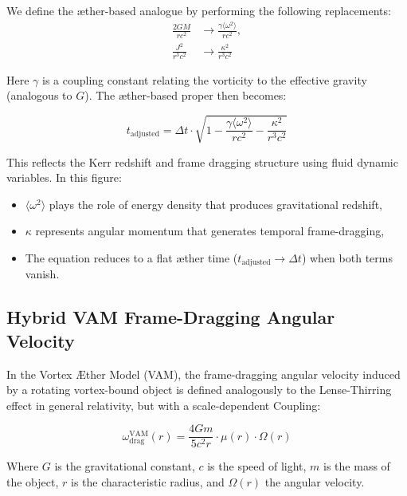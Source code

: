We define the æther-based analogue by performing the following replacements:
\begin{equation}
    \begin{aligned}
        \frac{2GM}{rc^2} &\rightarrow \frac{\gamma \langle \omega^2 \rangle}{rc^2}, \\
        \frac{J^2}{r^3c^2} &\rightarrow \frac{\kappa^2}{r^3c^2}
    \end{aligned}
    \label{eq:Kerr_replacements}
\end{equation}

Here $\gamma$ is a coupling constant relating the vorticity to the effective gravity (analogous to $G$). The æther-based proper then becomes:

\begin{equation}
    \boxed{t_\text{adjusted} = \Delta t \cdot \sqrt{1 - \frac{\gamma \langle \omega^2 \rangle}{rc^2} - \frac{\kappa^2}{r^3c^2}}}
    \label{eq:Kerr_time_dilation_ae}
\end{equation}

This reflects the Kerr redshift and frame dragging structure using fluid dynamic variables. In this figure:
\begin{itemize}
    \item $\langle \omega^2 \rangle$ plays the role of energy density that produces gravitational redshift,
    \item $\kappa$ represents angular momentum that generates temporal frame-dragging,
    \item The equation reduces to a flat æther time ($t_\text{adjusted} \to \Delta t$) when both terms vanish.

\end{itemize}

\subsection*{Hybrid VAM Frame-Dragging Angular Velocity}

In the Vortex Æther Model (VAM), the frame-dragging angular velocity induced by a rotating vortex-bound object is defined analogously to the Lense-Thirring effect in general relativity, but with a scale-dependent Coupling:

\begin{equation}
    \omega_\text{drag}^\text{VAM}(r) =
    \frac{4 G m}{5 c^2 r} \cdot \mu(r) \cdot \Omega(r)
\end{equation}

Where \( G \) is the gravitational constant, \( c \) is the speed of light, \( m \) is the mass of the object, \( r \) is the characteristic radius, and \( \Omega(r) \) the angular velocity.

